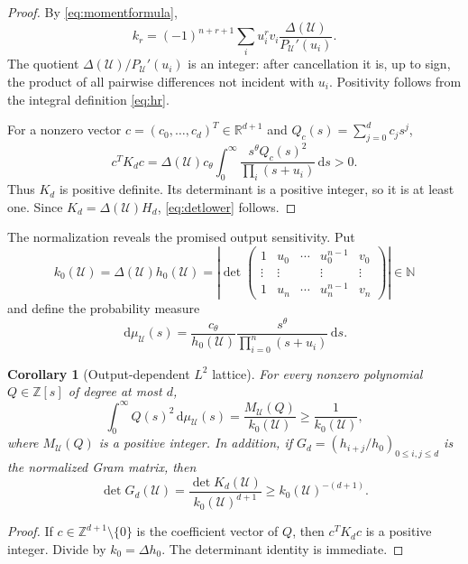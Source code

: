 \documentclass[11pt]{article}
\newtheorem{corollary}[theorem]{Corollary}
\theoremstyle{definition}
\theoremstyle{remark}
\newcommand{\N}{\mathbb N}
\newcommand{\Z}{\mathbb Z}
\newcommand{\R}{\mathbb R}
\newcommand{\dd}{\,\mathrm d}
\newcommand{\cst}{c_{\theta}}
\newcommand{\UU}{\mathcal U}
\begin{document}
\begin{proof}
By \eqref{eq:momentformula},
\[
 k_r=(-1)^{n+r+1}\sum_i u_i^rv_i\frac{\Delta(\UU)}{P_\UU'(u_i)}.
\]
The quotient $\Delta(\UU)/P_\UU'(u_i)$ is an integer: after cancellation it is, up to sign,
the product of all pairwise differences not incident with $u_i$.  Positivity follows from
the integral definition \eqref{eq:hr}.

For a nonzero vector $c=(c_0,\ldots,c_d)^T\in\R^{d+1}$ and
$Q_c(s)=\sum_{j=0}^dc_js^j$,
\[
 c^TK_dc=\Delta(\UU)\cst\int_0^\infty
 \frac{s^\theta Q_c(s)^2}{\prod_i(s+u_i)}\dd s>0.
\]
Thus $K_d$ is positive definite.  Its determinant is a positive integer, so it is at least
one.  Since $K_d=\Delta(\UU)H_d$, \eqref{eq:detlower} follows.
\end{proof}

The normalization reveals the promised output sensitivity.  Put
\begin{equation}\label{eq:k0}
 k_0(\UU)=\Delta(\UU)h_0(\UU)
 =\left|\det\begin{pmatrix}
 1&u_0&\cdots&u_0^{n-1}&v_0\\
 \vdots&\vdots&&\vdots&\vdots\\
 1&u_n&\cdots&u_n^{n-1}&v_n
 \end{pmatrix}\right|\in\N
\end{equation}
and define the probability measure
\begin{equation}\label{eq:mu}
 \dd\mu_\UU(s)=\frac{\cst}{h_0(\UU)}
 \frac{s^\theta}{\prod_{i=0}^n(s+u_i)}\dd s.
\end{equation}

\begin{corollary}[Output-dependent $L^2$ lattice]\label{cor:L2lattice}
For every nonzero polynomial $Q\in\Z[s]$ of degree at most $d$,
\begin{equation}\label{eq:L2lower}
 \int_0^\infty Q(s)^2\dd\mu_\UU(s)
 =\frac{M_\UU(Q)}{k_0(\UU)}\ge\frac1{k_0(\UU)},
\end{equation}
where $M_\UU(Q)$ is a positive integer.  In addition, if
$G_d=(h_{i+j}/h_0)_{0\le i,j\le d}$ is the normalized Gram matrix, then
\begin{equation}\label{eq:Gdet}
 \det G_d(\UU)=\frac{\det K_d(\UU)}{k_0(\UU)^{d+1}}
 \ge k_0(\UU)^{-(d+1)}.
\end{equation}
\end{corollary}

\begin{proof}
If $c\in\Z^{d+1}\setminus\{0\}$ is the coefficient vector of $Q$, then
$c^TK_dc$ is a positive integer.  Divide by $k_0=\Delta h_0$.  The determinant identity is
immediate.
\end{proof}
\end{document}
